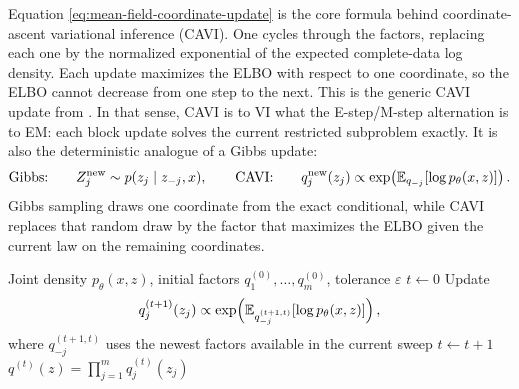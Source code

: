 Equation \eqref{eq:mean-field-coordinate-update} is the core formula behind coordinate-ascent variational inference (CAVI).
One cycles through the factors, replacing each one by the normalized exponential of the expected complete-data log density.
Each update maximizes the ELBO with respect to one coordinate, so the ELBO cannot decrease from one step to the next.
This is the generic CAVI update from \citet[\S2.4, eqs.~(17)--(18)]{blei_kucukelbir_mcauliffe_2017_vi_review}.
In that sense, CAVI is to VI what the E-step/M-step alternation is to EM: each block update solves the current restricted subproblem exactly.
It is also the deterministic analogue of a Gibbs update:
\[
  \text{Gibbs:}\qquad Z_j^{\mathrm{new}} \sim p(z_j\mid z_{-j},x),
  \qquad
  \text{CAVI:}\qquad q_j^{\mathrm{new}}(z_j)\propto \exp\!\left(\mathbb{E}_{q_{-j}}[\log p_\theta(x,z)]\right).
\]
Gibbs sampling draws one coordinate from the exact conditional, while CAVI replaces that random draw by the factor that maximizes the ELBO given the current law on the remaining coordinates.

\begin{algorithm}[H]
  \caption{Coordinate-ascent mean-field VI}
  \label{alg:cavi}
  \begin{algorithmic}[1]
    \Require Joint density \(p_\theta(x,z)\), initial factors $q_1^{(0)},\dots,q_m^{(0)}$, tolerance $\varepsilon$
    \State $t \gets 0$
    \Repeat
        \State Update
        \[
          q_j^{(t+1)}(z_j)
          \propto
          \exp\!\left(
            \mathbb{E}_{q_{-j}^{(t+1,t)}}[\log p_\theta(x,z)]
          \right),
        \]
        where $q_{-j}^{(t+1,t)}$ uses the newest factors available in the current sweep
      \EndFor
      \State $t \gets t+1$
    \State \Return $q^{(t)}(z)=\prod_{j=1}^m q_j^{(t)}(z_j)$
  \end{algorithmic}
\end{algorithm}

